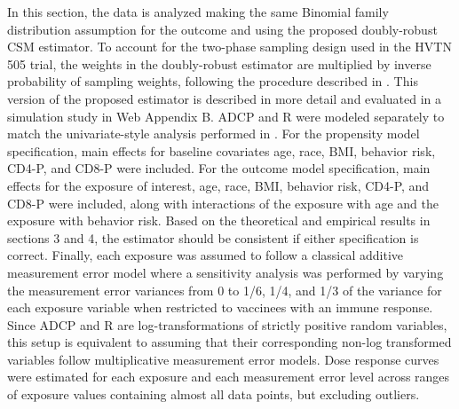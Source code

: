 \documentclass[useAMS,usenatbib,referee]{biom}
\newcommand{\RNum}[1]{\uppercase\expandafter{\romannumeral #1\relax}}
\begin{document}
In this section, the data is analyzed making the same Binomial family distribution assumption for the outcome and using the proposed doubly-robust CSM estimator. To account for the two-phase sampling design used in the HVTN 505 trial, the weights in the doubly-robust estimator are multiplied by inverse probability of sampling weights, following the procedure described in \citet{wang2009}. This version of the proposed estimator is described in more detail and evaluated in a simulation study in Web Appendix B. ADCP and R\RNum{2} were modeled separately to match the univariate-style analysis performed in \citet{neidich2019}. For the propensity model specification, main effects for baseline covariates age, race, BMI, behavior risk, CD4-P, and CD8-P were included. For the outcome model specification, main effects for the exposure of interest, age, race, BMI, behavior risk, CD4-P, and CD8-P were included, along with interactions of the exposure with age and the exposure with behavior risk. Based on the theoretical and empirical results in sections 3 and 4, the estimator should be consistent if either specification is correct. Finally, each exposure was assumed to follow a classical additive measurement error model where a sensitivity analysis was performed by varying the measurement error variances from 0 to 1/6, 1/4, and 1/3 of the variance for each exposure variable when restricted to vaccinees with an immune response. Since ADCP and R\RNum{2} are log-transformations of strictly positive random variables, this setup is equivalent to assuming that their corresponding non-log transformed variables follow multiplicative measurement error models. Dose response curves were estimated for each exposure and each measurement error level across ranges of exposure values containing almost all data points, but excluding outliers.
\end{document}
